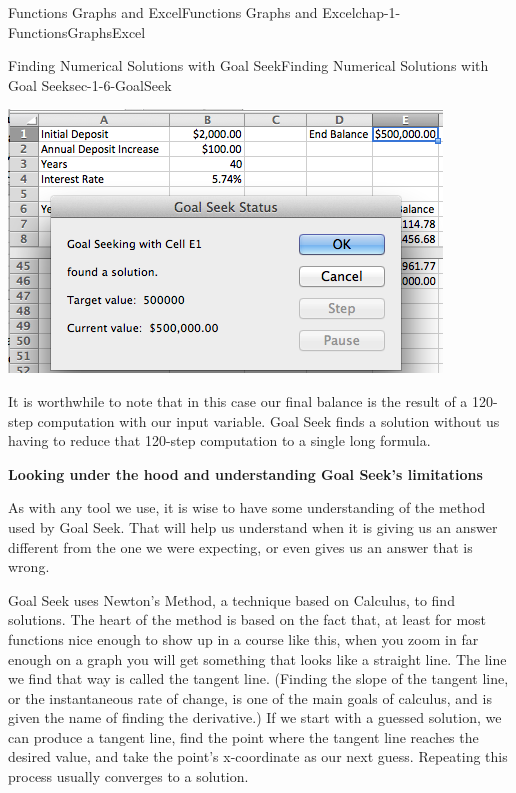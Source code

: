 \documentclass[oneside,10pt,]{book}
\newcommand{\terminology}[1]{\textbf{#1}}
\numberwithin{equation}{section}
\begin{document}
\begin{chapterptx}{Functions Graphs and Excel}{}{Functions Graphs and Excel}{}{}{chap-1-FunctionsGraphsExcel}
\begin{sectionptx}{Finding Numerical Solutions with Goal Seek}{}{Finding Numerical Solutions with Goal Seek}{}{}{sec-1-6-GoalSeek}
\begin{sidebyside}{1}{0.1}{0.1}{0}
\begin{sbspanel}{0.8}
\includegraphics[width=1\linewidth]{images/sec1-6-10.png}
\end{sbspanel}%
\end{sidebyside}%
%
\par
\hypertarget{p-489}{}%
It is worthwhile to note that in this case our final balance is the result of a 120-step computation with our input variable.  Goal Seek finds a solution without us having to reduce that 120-step computation to a single long formula.%
\par
\hypertarget{p-490}{}%
\terminology{Looking under the hood and understanding Goal Seek's limitations}%
\par
\hypertarget{p-491}{}%
As with any tool we use, it is wise to have some understanding of the method used by Goal Seek.  That will help us understand when it is giving us an answer different from the one we were expecting, or even gives us an answer that is wrong.%
\par
\hypertarget{p-492}{}%
Goal Seek uses Newton's Method, a technique based on Calculus, to find solutions.  The heart of the method is based on the fact that, at least for most functions nice enough to show up in a course like this, when you zoom in far enough on a graph you will get something that looks like a straight line.  The line we find that way is called the tangent line.  (Finding the slope of the tangent line, or the instantaneous rate of change, is one of the main goals of calculus, and is given the name of finding the derivative.)  If we start with a guessed solution, we can produce a tangent line, find the point where the tangent line reaches the desired value, and take the point's x-coordinate as our next guess.  Repeating this process usually converges to a solution. \leavevmode%
\begin{sidebyside}{1}{0.1}{0.1}{0}%

\end{sidebyside}
\end{sectionptx}
\end{chapterptx}
\end{document}
